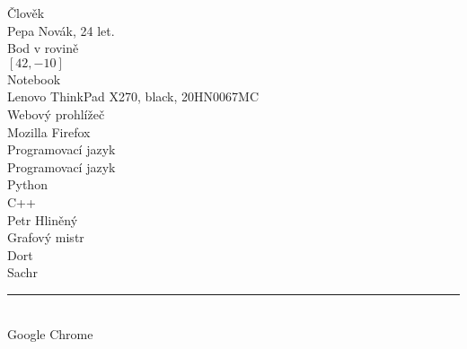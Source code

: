 \documentclass[12pt,a4paper]{article}
\begin{document}
\pagestyle{empty}

\setlength\parindent{0pt}
\setlength{\columnsep}{60pt}
\begin{multicols}{2}

\Large

Člověk\\

Pepa Novák, 24 let.\\

Bod v rovině\\

$[42, -10]$\\

Notebook\\

Lenovo ThinkPad X270, black,  20HN0067MC\\

Webový prohlížeč\\

Mozilla Firefox\\

Programovací jazyk\\

Programovací jazyk\\

Python\\

C++\\

Petr Hliněný\\

Grafový mistr\\

Dort\\

Sachr\\

\rule{\linewidth}{1pt}\\

Google Chrome\\

\end{multicols}
\end{document}
